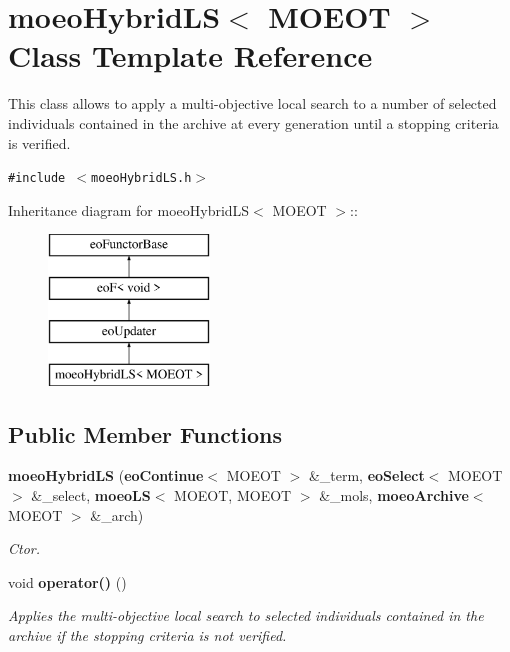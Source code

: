 \section{moeo\-Hybrid\-LS$<$ MOEOT $>$ Class Template Reference}
\label{classmoeoHybridLS}
This class allows to apply a multi-objective local search to a number of selected individuals contained in the archive at every generation until a stopping criteria is verified.  


{\tt \#include $<$moeo\-Hybrid\-LS.h$>$}

Inheritance diagram for moeo\-Hybrid\-LS$<$ MOEOT $>$::\begin{figure}[H]
\begin{center}
\leavevmode
\includegraphics[height=4cm]{classmoeoHybridLS}
\end{center}
\end{figure}
\subsection*{Public Member Functions}
\begin{CompactItemize}
\item 
{\bf moeo\-Hybrid\-LS} ({\bf eo\-Continue}$<$ MOEOT $>$ \&\_\-term, {\bf eo\-Select}$<$ MOEOT $>$ \&\_\-select, {\bf moeo\-LS}$<$ MOEOT, MOEOT $>$ \&\_\-mols, {\bf moeo\-Archive}$<$ MOEOT $>$ \&\_\-arch)
\begin{CompactList}\small\item\em Ctor. \item\end{CompactList}\item 
void {\bf operator()} ()\label{classmoeoHybridLS_bd35c0f0e03914b1b669cb064310d3eb}

\begin{CompactList}\small\item\em Applies the multi-objective local search to selected individuals contained in the archive if the stopping criteria is not verified. \item\end{CompactList}\end{CompactItemize}
